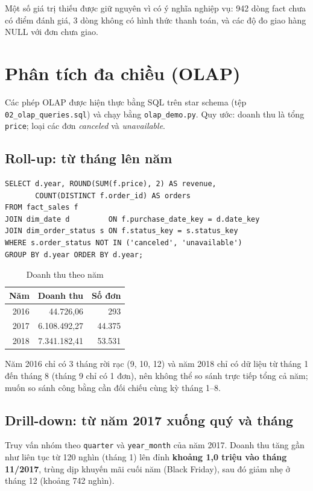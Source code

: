 \documentclass[12pt,a4paper]{article}
\newcommand{\code}[1]{\texttt{\small #1}}
\begin{document}
Một số giá trị thiếu được giữ nguyên vì có ý nghĩa nghiệp vụ: 942 dòng fact chưa có điểm đánh giá, 3 dòng không
có hình thức thanh toán, và các độ đo giao hàng NULL với đơn chưa giao.

\section{Phân tích đa chiều (OLAP)}

Các phép OLAP được hiện thực bằng SQL trên star schema (tệp \code{02\_olap\_queries.sql}) và chạy bằng
\code{olap\_demo.py}. Quy ước: doanh thu là tổng \code{price}; loại các đơn \emph{canceled} và \emph{unavailable}.

\subsection{Roll-up: từ tháng lên năm}
\begin{lstlisting}[style=sql]
SELECT d.year, ROUND(SUM(f.price), 2) AS revenue,
       COUNT(DISTINCT f.order_id) AS orders
FROM fact_sales f
JOIN dim_date d         ON f.purchase_date_key = d.date_key
JOIN dim_order_status s ON f.status_key = s.status_key
WHERE s.order_status NOT IN ('canceled', 'unavailable')
GROUP BY d.year ORDER BY d.year;
\end{lstlisting}

\begin{table}[h]
\centering
\caption{Doanh thu theo năm}
\small
\begin{tabular}{@{}r r r@{}}
\toprule
\textbf{Năm} & \textbf{Doanh thu} & \textbf{Số đơn}\\
\midrule
2016 & 44.726,06 & 293\\
2017 & 6.108.492,27 & 44.375\\
2018 & 7.341.182,41 & 53.531\\
\bottomrule
\end{tabular}
\end{table}

Năm 2016 chỉ có 3 tháng rời rạc (9, 10, 12) và năm 2018 chỉ có dữ liệu từ tháng 1 đến tháng 8 (tháng 9 chỉ có 1 đơn), nên không thể so sánh trực tiếp tổng cả năm; muốn so sánh công bằng cần đối chiếu cùng kỳ tháng 1--8.

\subsection{Drill-down: từ năm 2017 xuống quý và tháng}
Truy vấn nhóm theo \code{quarter} và \code{year\_month} của năm 2017. Doanh thu tăng gần như liên tục từ
120 nghìn (tháng 1) lên đỉnh \textbf{khoảng 1,0 triệu vào tháng 11/2017}, trùng dịp khuyến mãi cuối năm
(Black Friday), sau đó giảm nhẹ ở tháng 12 (khoảng 742 nghìn).
\end{document}
